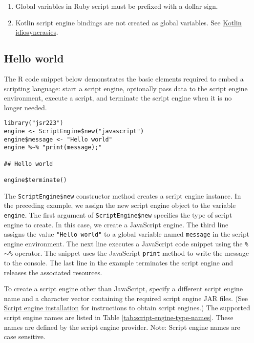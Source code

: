 \documentclass[
article,
11pt, %
a4paper, %
oneside, %
headinclude,footinclude, %
]{scrartcl}
\theoremstyle{definition} %
\theoremstyle{plain} %
\theoremstyle{remark} %
\newcommand{\code}[1]{\texttt{#1}}
\newcommand{\strong}[1]{\texorpdfstring{{\normalfont\fontseries{b}\selectfont #1}}{#1}}
\begin{document}
\begin{enumerate}
\item Global variables in Ruby script must be prefixed with a dollar sign.
\item Kotlin script engine bindings are not created as global variables. See \hyperlink{kotlin-idiosyncrasies}{Kotlin idiosyncrasies}.
\end{enumerate}

\subsection{Hello world}

The R code snippet below demonstrates the basic elements required to embed a scripting language: start a script engine, optionally pass data to the script engine environment, execute a script, and terminate the script engine when it is no longer needed.

\begin{verbatim}
library("jsr223")
engine <- ScriptEngine$new("javascript")
engine$message <- "Hello world"
engine %~% "print(message);"

## Hello world

engine$terminate()
\end{verbatim}

The \code{ScriptEngine\$new} constructor method creates a script engine instance. In the preceding example, we assign the new script engine object to the variable \code{engine}. The first argument of \code{ScriptEngine\$new} specifies the type of script engine to create. In this case, we create a JavaScript engine. The third line assigns the value \code{"Hello world"} to a global variable named \code{message} in the script engine environment. The next line executes a JavaScript code snippet using the \code{\%$\sim$\%} operator. The snippet uses the JavaScript \code{print} method to write the message to the console. The last line in the example terminates the script engine and releases the associated resources.

To create a script engine other than JavaScript, specify a different script engine name and a character vector containing the required script engine JAR files. (See \hyperlink{script-engine-installation}{Script engine installation} for instructions to obtain script engines.) The supported script engine names are listed in Table \ref{tab:script-engine-type-names}. These names are defined by the script engine provider. \strong{Note:} Script engine names are case sensitive.
\end{document}
